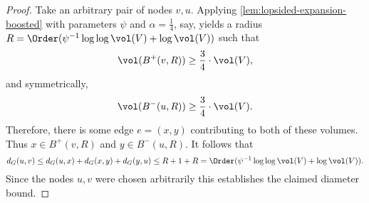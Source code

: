 \lemLexpDiam*

\begin{proof}
	Take an arbitrary pair of nodes $v, u$. Applying \cref{lem:lopsided-expansion-boosted} with parameters $\psi$ and $\alpha = \frac{1}{4}$, say, yields a radius $R = \Order(\psi^{-1} \log\log \vol(V) + \log \vol(V))$ such that
	\begin{equation*}
		\vol(B^+(v, R)) \geq \frac{3}{4} \cdot \vol(V),
	\end{equation*}
	and symmetrically,
	\begin{equation*}
		\vol(B^-(u, R)) \geq \frac{3}{4} \cdot \vol(V).
	\end{equation*}
	Therefore, there is some edge $e = (x, y)$ contributing to both of these volumes. Thus $x \in B^+(v, R)$ and $y \in B^-(u, R)$. It follows that
	\begin{equation*}
		d_G(u, v) \leq d_G(u, x) + d_G(x, y) +  d_G(y, u) \leq R + 1 + R = \Order(\psi^{-1} \log\log \vol(V) + \log \vol(V)).
	\end{equation*}
	Since the nodes $u, v$ were chosen arbitrarily this establishes the claimed diameter bound.
\end{proof}

